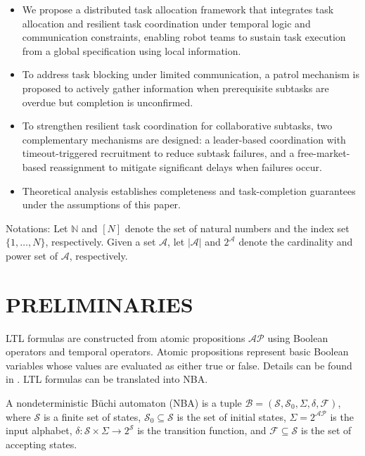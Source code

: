 \documentclass[lettersize,journal]{IEEEtran}
\begin{document}
\begin{itemize}
\item We propose a distributed task allocation framework that integrates task allocation and resilient task coordination under temporal logic and communication constraints, enabling robot teams to sustain task execution from a global specification using  local  information.

\item To address task blocking under limited communication, a patrol mechanism is proposed to actively gather information when prerequisite subtasks are overdue but completion is unconfirmed.

\item To strengthen resilient task coordination for collaborative subtasks, two complementary mechanisms are designed: a leader-based coordination with timeout-triggered recruitment to reduce subtask failures, and a free-market-based reassignment to mitigate significant delays when failures occur.

\item Theoretical analysis establishes completeness and task-completion guarantees under the assumptions of this paper.
\end{itemize}

Notations: Let $\mathbb{N}$ and $[N]$ denote the set of natural numbers and the index set $\{1,\ldots,N\}$, respectively. Given a set $\mathcal{A}$, let $|\mathcal{A}|$ and $2^{\mathcal{A}}$ denote the cardinality and power set of $\mathcal{A}$, respectively.

\section{PRELIMINARIES}
LTL formulas are constructed from atomic propositions $\mathcal{AP}$ using Boolean operators and temporal operators. Atomic propositions represent basic Boolean variables whose values are evaluated as either true or false. Details can be found in \cite{baier2008principles}. LTL formulas can be translated into NBA.

\begin{definition}\label{def1}
A nondeterministic Büchi automaton (NBA) is a tuple $\mathcal{B}=(\mathcal{S},\mathcal{S}_0,\Sigma,\delta,\mathcal{F})$, where $\mathcal{S}$ is a finite set of states, $\mathcal{S}_0\subseteq \mathcal{S}$ is the set of initial states, $\Sigma=2^{\mathcal{AP}}$ is the input alphabet, $\delta:\mathcal{S}\times\Sigma\to 2^{\mathcal{S}}$ is the transition function, and $\mathcal{F}\subseteq \mathcal{S}$ is the set of accepting states.
\end{definition}
\end{document}
